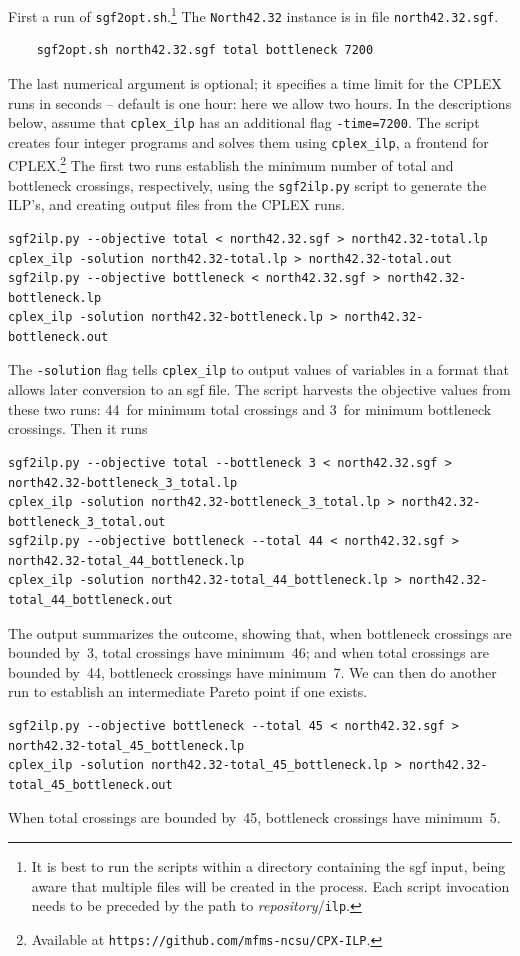 First a run of \texttt{sgf2opt.sh}.\footnote{It is best to run the scripts within a directory containing the sgf input, being aware that multiple files will be created in the process. Each script invocation needs to be preceded by the path to \emph{repository}/\texttt{ilp}.} The \texttt{North42.32} instance is in file \texttt{north42.32.sgf}.
\begin{verbatim}
    sgf2opt.sh north42.32.sgf total bottleneck 7200
\end{verbatim}
The last numerical argument is optional; it specifies a time limit for the CPLEX runs in seconds -- default is one hour: here we allow two hours. In the descriptions below, assume that \texttt{cplex\_ilp} has an additional flag \texttt{-time=7200}. The script creates four integer programs and solves them using \texttt{cplex\_ilp}, a frontend for CPLEX.\footnote{Available at \texttt{https://github.com/mfms-ncsu/CPX-ILP}.}
The first two runs establish the minimum number of total and bottleneck crossings, respectively, using the \texttt{sgf2ilp.py} script to generate the ILP's, and creating output files from the CPLEX runs.
{\small
\begin{verbatim}
sgf2ilp.py --objective total < north42.32.sgf > north42.32-total.lp
cplex_ilp -solution north42.32-total.lp > north42.32-total.out
sgf2ilp.py --objective bottleneck < north42.32.sgf > north42.32-bottleneck.lp
cplex_ilp -solution north42.32-bottleneck.lp > north42.32-bottleneck.out
\end{verbatim}
}
The \texttt{-solution} flag tells \texttt{cplex\_ilp} to output values of variables in a format that allows later conversion to an sgf file.
The script harvests the objective values from these two runs: 44~for minimum total crossings and 3~for minimum bottleneck crossings. Then it runs
{\small
\begin{verbatim}
sgf2ilp.py --objective total --bottleneck 3 < north42.32.sgf > north42.32-bottleneck_3_total.lp
cplex_ilp -solution north42.32-bottleneck_3_total.lp > north42.32-bottleneck_3_total.out
sgf2ilp.py --objective bottleneck --total 44 < north42.32.sgf > north42.32-total_44_bottleneck.lp
cplex_ilp -solution north42.32-total_44_bottleneck.lp > north42.32-total_44_bottleneck.out
\end{verbatim}
}
The output summarizes the outcome, showing that, when bottleneck crossings are bounded by~3, total crossings have minimum~46; and when total crossings are bounded by~44, bottleneck crossings have minimum~7. We can then do another run to establish an intermediate Pareto point if one exists.
{\small
\begin{verbatim}
sgf2ilp.py --objective bottleneck --total 45 < north42.32.sgf > north42.32-total_45_bottleneck.lp
cplex_ilp -solution north42.32-total_45_bottleneck.lp > north42.32-total_45_bottleneck.out
\end{verbatim}
}
When total crossings are bounded by~45, bottleneck crossings have minimum~5.

